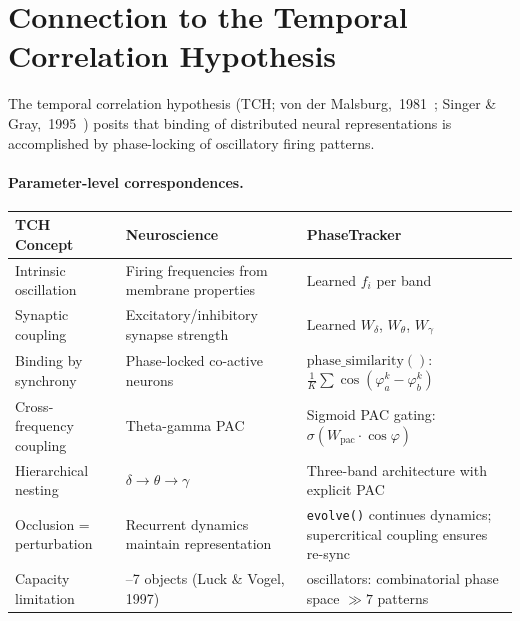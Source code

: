 \documentclass[11pt]{article}
\begin{document}
\section{Connection to the Temporal Correlation Hypothesis}
\label{app:tch}

The temporal correlation hypothesis (TCH; von der
Malsburg,~1981~\cite{malsburg1981}; Singer \& Gray,~1995~\cite{singer1995})
posits that binding of distributed neural representations is accomplished
by phase-locking of oscillatory firing patterns.

\paragraph{Parameter-level correspondences.}\nopagebreak
\begin{center}
\small
\begin{tabular}{>{\raggedright\arraybackslash}p{3cm} >{\raggedright\arraybackslash}p{3cm} >{\raggedright\arraybackslash}p{5.5cm}}
\toprule
TCH Concept & Neuroscience & PhaseTracker \\
\midrule
Intrinsic oscillation & Firing frequencies from membrane properties &
  Learned $f_i$ per band \\
Synaptic coupling & Excitatory/\allowbreak inhibitory synapse strength &
  Learned $W_\delta$, $W_\theta$, $W_\gamma$ \\
Binding by synchrony & Phase-locked co-active neurons &
  $\text{phase\_similarity}()$: $\frac{1}{K}\sum\cos(\varphi_a^k - \varphi_b^k)$ \\
Cross-frequency coupling & Theta-gamma PAC &
  Sigmoid PAC gating: $\sigma(W_{\text{pac}} \cdot \cos\varphi)$ \\
Hierarchical nesting & $\delta \to \theta \to \gamma$ &
  Three-band architecture with explicit PAC \\
Occlusion = perturbation & Recurrent dynamics maintain representation &
  \texttt{evolve()} continues dynamics; supercritical coupling ensures re-sync \\
Capacity limitation & 4--7 objects (Luck \& Vogel, 1997) &
  28 oscillators: combinatorial phase space $\gg 7$ patterns \\
\bottomrule
\end{tabular}
\end{center}
\end{document}
